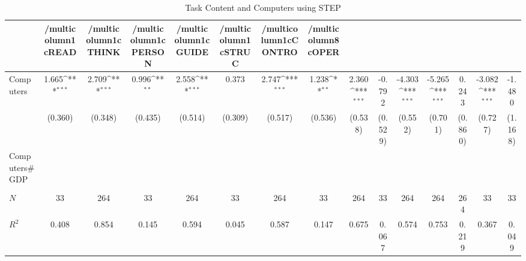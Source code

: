 \begin{table}[htbp]\centering
\def\sym#1{\ifmmode^{#1}\else\(^{#1}\)\fi}
\caption{Task Content and Computers using STEP}
\begin{tabular}{l*{14}{c}}
\hline\hline
            &/multicolumn{1}{c}{READ}&/multicolumn{1}{c}{THINK}&/multicolumn{1}{c}{PERSON}&/multicolumn{1}{c}{GUIDE}&/multicolumn{1}{c}{STRUC}&/multicolumn{1}{c}{CONTRO}&/multicolumn{8}{c}{OPER}                                                                                                                                                       \\
\hline
Computers   &       1.665\sym{***}&       2.709\sym{***}&       0.996\sym{**} &       2.558\sym{***}&       0.373         &       2.747\sym{***}&       1.238\sym{**} &       2.360\sym{***}&      -0.792         &      -4.303\sym{***}&      -5.265\sym{***}&       0.243         &      -3.082\sym{***}&      -1.480         \\
            &     (0.360)         &     (0.348)         &     (0.435)         &     (0.514)         &     (0.309)         &     (0.517)         &     (0.536)         &     (0.538)         &     (0.529)         &     (0.552)         &     (0.701)         &     (0.860)         &     (0.727)         &     (1.168)         \\
[1em]
Computers#GDP&                     &                     &                     &                     &                     &                     &                     &                     &                     &                     &                     &                     &                     &                     \\
            &                     &                     &                     &                     &                     &                     &                     &                     &                     &                     &                     &                     &                     &                     \\
\hline
\(N\)       &          33         &         264         &          33         &         264         &          33         &         264         &          33         &         264         &          33         &         264         &         264         &         264         &          33         &          33         \\
\(R^{2}\)   &       0.408         &       0.854         &       0.145         &       0.594         &       0.045         &       0.587         &       0.147         &       0.675         &       0.067         &       0.574         &       0.753         &       0.219         &       0.367         &       0.049         \\
\hline\hline
\end{tabular}
\end{table}
